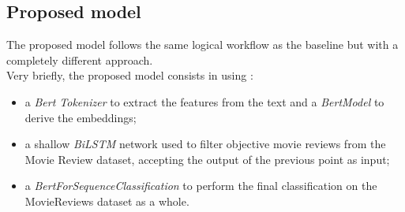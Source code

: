 \subsection{Proposed model}
The proposed model follows the same logical workflow as the baseline but with a completely different approach.\\
Very briefly, the proposed model consists in using :
\begin{itemize}
    \item a \textit{Bert Tokenizer} \cite{tokenizer} to extract the features from the text and a \textit{BertModel} \cite{model} to derive the embeddings;
    \item a shallow \textit{BiLSTM} network used to filter objective movie reviews from the Movie Review dataset, accepting the output of the previous point as input;
    \item a \textit{BertForSequenceClassification} to perform the final classification on the MovieReviews dataset as a whole.
\end{itemize}

